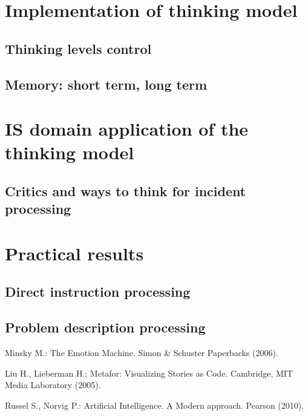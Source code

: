 \documentclass[runningheads,a4paper]{llncs}
\begin{document}
\section{Implementation of thinking model}
\subsection{Thinking levels control}
\subsection{Memory: short term, long term}


\section{IS domain application of the thinking model}
\subsection{Critics and ways to think for incident processing}

\section{Practical results}
\subsection{Direct instruction processing}
\subsection{Problem description processing}


\begin{thebibliography}{4}

Minsky M.:
The Emotion Machine.
Simon \& Schuster Paperbacks  (2006).

Liu H., Lieberman H.:
Metafor: Visualizing Stories as Code.
Cambridge, MIT Media Laboratory  (2005).

Russel S., Norvig P.:
Artificial Intelligence. A Modern approach.
Pearson (2010).

\end{thebibliography}
\end{document}
